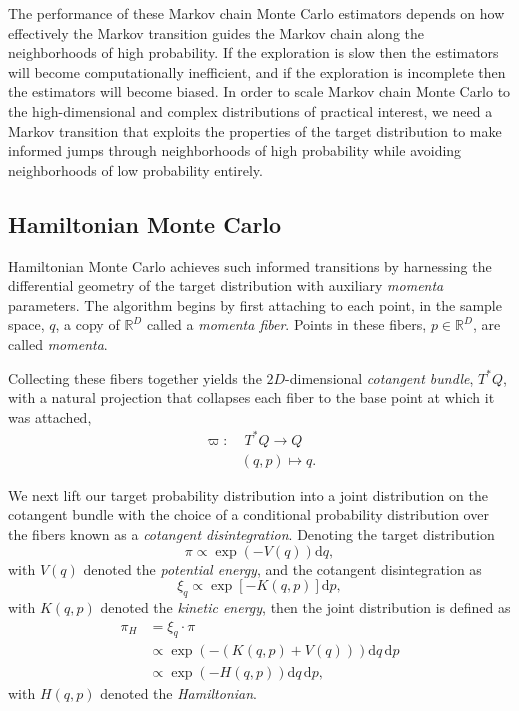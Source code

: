 \documentclass[stslayout]{imsart}
\newcommand\dd{\mathrm{d}}
\begin{document}
The performance of these Markov chain Monte Carlo estimators depends
on how effectively the Markov transition guides the Markov chain 
along the neighborhoods of high probability.  If the exploration is
slow then the estimators will become computationally inefficient,
and if the exploration is incomplete then the estimators will become
biased.  In order to scale Markov chain Monte Carlo to the
high-dimensional and complex distributions of practical interest,
we need a Markov transition that exploits the properties of the
target distribution to make informed jumps through neighborhoods
of high probability while avoiding neighborhoods of low probability
entirely.

\subsection{Hamiltonian Monte Carlo}

Hamiltonian Monte Carlo achieves such informed transitions by
harnessing the differential geometry of the target distribution with
auxiliary \emph{momenta} parameters.  The algorithm begins by
first attaching to each point, in the sample space, $q$, a copy of
$\mathbb{R}^{D}$ called a \emph{momenta fiber}.  Points in these
fibers, $p \in \mathbb{R}^{D}$, are called \emph{momenta}.

Collecting these fibers together yields the $2D$-dimensional 
\emph{cotangent bundle}, $T^{*} Q$, with a natural projection that 
collapses each fiber to the base point at which it was attached, 
%
\begin{align*}
\varpi:& \; T^{*} Q \rightarrow Q
\\
& (q, p) \mapsto q.
\end{align*}

We next lift our target probability distribution into a joint distribution
on the cotangent bundle with the choice of a conditional probability 
distribution over the fibers known as a \emph{cotangent disintegration}.  
Denoting the target distribution 
%
\begin{equation*}
\pi \propto \exp \! \left( - V ( q ) \right) \dd q,
\end{equation*}
%
with $V ( q )$ denoted the \emph{potential energy}, and the cotangent 
disintegration as
%
\begin{equation*}
\xi_{q} \propto \exp \! \left[ - K (q, p) \right] \dd p,
\end{equation*}
%
with $K (q, p)$ denoted the \emph{kinetic energy}, then the joint distribution
is defined as
%
\begin{align*}
\pi_{H} 
&=
\xi_{q} \cdot \pi
\\
&\propto \exp \! \left( - \left( K (q, p) + V (q) \right) \right) \dd q \, \dd p
\\
&\propto \exp \! \left(- H (q, p) \right) \dd q \, \dd p,
\end{align*}
%
with $H (q, p)$ denoted the \textit{Hamiltonian}.
\end{document}
